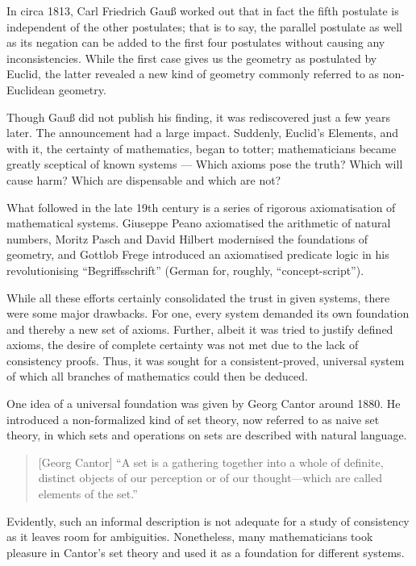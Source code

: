 \documentclass[hidelinks]{article}
\begin{document}
In circa 1813, Carl Friedrich Gauß worked out that in fact the fifth postulate is independent of the other postulates; that is to say, the parallel postulate as well as its negation can be added to the first four postulates without causing any inconsistencies. While the first case gives us the geometry as postulated by Euclid, the latter revealed a new kind of geometry commonly referred to as non-Euclidean geometry.

Though Gauß did not publish his finding, it was rediscovered just a few years later. The announcement had a large impact. Suddenly, Euclid's Elements, and with it, the certainty of mathematics, began to totter; mathematicians became greatly sceptical of known systems --- Which axioms pose the truth? Which will cause harm? Which are dispensable and which are not?

What followed in the late 19th century is a series of rigorous axiomatisation of mathematical systems. Giuseppe Peano axiomatised the arithmetic of natural numbers, Moritz Pasch and David Hilbert modernised the foundations of geometry, and Gottlob Frege introduced an axiomatised predicate logic in his revolutionising ``Begriffsschrift'' (German for, roughly, ``concept-script'').

While all these efforts certainly consolidated the trust in given systems, there were some major drawbacks. For one, every system demanded its own foundation and thereby a new set of axioms. Further, albeit it was tried to justify defined axioms, the desire of complete certainty was not met due to the lack of consistency proofs. Thus, it was sought for a consistent-proved, universal system of which all branches of mathematics could then be deduced.

One idea of a universal foundation was given by Georg Cantor around 1880. He introduced a non-formalized kind of set theory, now referred to as naive set theory, in which sets and operations on sets are described with natural language. 

\begin{quote}[Georg Cantor]
``A set is a gathering together into a whole of definite, distinct objects of our perception or of our thought—which are called elements of the set.''\cite{cantor_set}
\end{quote}

Evidently, such an informal description is not adequate for a study of consistency as it leaves room for ambiguities. Nonetheless, many mathematicians took pleasure in Cantor's set theory and used it as a foundation for different systems.
\end{document}
